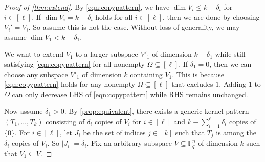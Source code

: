 \documentclass[11pt]{article}
\theoremstyle{plain}
\theoremstyle{definition}
\theoremstyle{remark}
\newcommand{\F}{\mathbb{F}}
\begin{document}
\begin{proof}[Proof of \cref{thm:extend}]
By \eqref{eqn:copypattern}, we have $\dim V_i\leq k-\delta_i$ for $i\in [\ell]$.
If $\dim V_i=k-\delta_i$ holds for all $i\in [\ell]$, then we are done by choosing $V_i'=V_i$.
So assume this is not the case. Without loss of generality, we may assume $\dim V_1<k-\delta_1$. 

We want to extend $V_1$ to a larger subspace $V'_1$ of dimension $k-\delta_1$ while still satisfying \eqref{eqn:copypattern} for all nonempty $\Omega\subseteq [\ell]$. If $\delta_1=0$, then we can choose any subspace $V'_1$ of dimension $k$ containing $V_1$. This is because \eqref{eqn:copypattern} holds for any nonempty $\Omega\subseteq [\ell]$ that excludes $1$. Adding $1$ to $\Omega$ can only decrease LHS of \eqref{eqn:copypattern} while RHS remains unchanged. 

Now assume $\delta_1>0$. By \cref{prop:equivalent}, there exists a generic kernel pattern $(T_1,\ldots,T_k)$ consisting of $\delta_i$ copies of $V_i$ for $i\in [\ell]$ and $k-\sum_{i=1}^\ell \delta_i$ copies of $\{0\}$. 
For $i\in [\ell]$, let $J_i$ be the set of indices $j\in [k]$ such that $T_j$ is among the $\delta_i$ copies of $V_i$. 
So $|J_i|=\delta_i$.
Fix an arbitrary subspace $V\subseteq \F_q^n$ of dimension $k$ such that $V_1\subseteq V$.
		

\end{proof}
\end{document}

